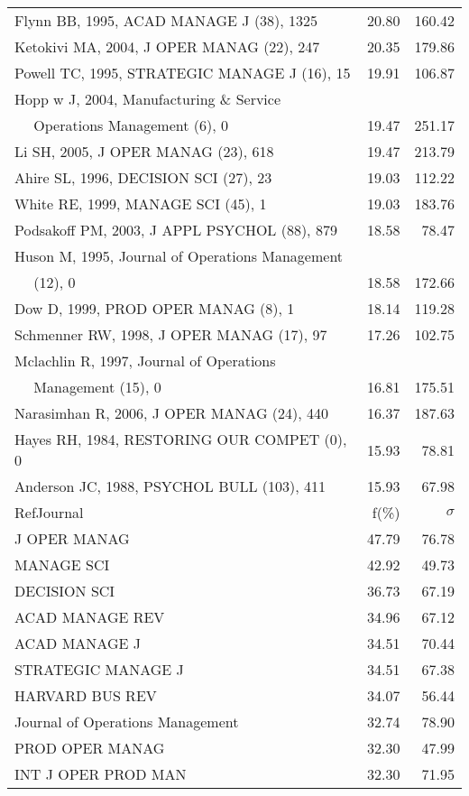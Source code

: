 \documentclass[a4paper,11pt]{report}
\begin{document}
\begin{landscape}
\begin{table}[!ht]
{\begin{tabular}{|l r r|}
Flynn BB, 1995, ACAD MANAGE J (38), 1325 & 20.80 & 160.42\\
Ketokivi MA, 2004, J OPER MANAG (22), 247 & 20.35 & 179.86\\
Powell TC, 1995, STRATEGIC MANAGE J (16), 15 & 19.91 & 106.87\\
Hopp w J, 2004, Manufacturing \& Service &  & \\
$\quad$ Operations Management (6), 0 & 19.47 & 251.17\\
Li SH, 2005, J OPER MANAG (23), 618 & 19.47 & 213.79\\
Ahire SL, 1996, DECISION SCI (27), 23 & 19.03 & 112.22\\
White RE, 1999, MANAGE SCI (45), 1 & 19.03 & 183.76\\
Podsakoff PM, 2003, J APPL PSYCHOL (88), 879 & 18.58 & 78.47\\
Huson M, 1995, Journal of Operations Management &  & \\
$\quad$ (12), 0 & 18.58 & 172.66\\
Dow D, 1999, PROD OPER MANAG (8), 1 & 18.14 & 119.28\\
Schmenner RW, 1998, J OPER MANAG (17), 97 & 17.26 & 102.75\\
Mclachlin R, 1997, Journal of Operations &  & \\
$\quad$ Management (15), 0 & 16.81 & 175.51\\
Narasimhan R, 2006, J OPER MANAG (24), 440 & 16.37 & 187.63\\
Hayes RH, 1984, RESTORING OUR COMPET (0), 0 & 15.93 & 78.81\\
Anderson JC, 1988, PSYCHOL BULL (103), 411 & 15.93 & 67.98\\
\hline
\hline
RefJournal & f(\%) & $\sigma$\\
\hline
J OPER MANAG & 47.79 & 76.78\\
MANAGE SCI & 42.92 & 49.73\\
DECISION SCI & 36.73 & 67.19\\
ACAD MANAGE REV & 34.96 & 67.12\\
ACAD MANAGE J & 34.51 & 70.44\\
STRATEGIC MANAGE J & 34.51 & 67.38\\
HARVARD BUS REV & 34.07 & 56.44\\
Journal of Operations Management & 32.74 & 78.90\\
PROD OPER MANAG & 32.30 & 47.99\\
INT J OPER PROD MAN & 32.30 & 71.95\\
\hline
\end{tabular}
}
\end{table}


\end{landscape}
\end{document}
